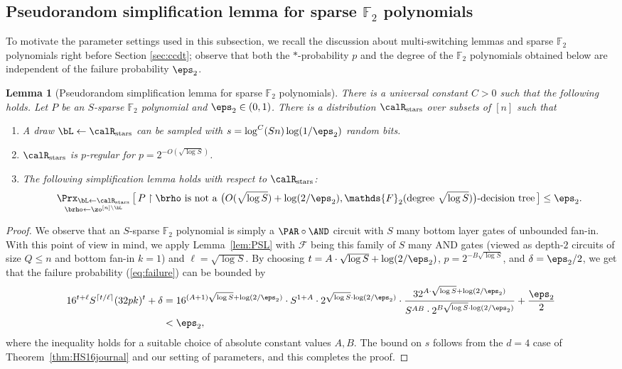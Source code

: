 \documentclass[11pt]{article}
\numberwithin{equation}{section}
\newtheorem{lemma}[theorem]{Lemma}
\theoremstyle{definition}
\theoremstyle{plain}
\theoremstyle{plain}
\newcommand{\uhr}{\upharpoonright}
\newcommand{\stars}{\mathrm{stars}}
\renewcommand{\F}{\mathds{F}}
\begin{document}
\subsection{Pseudorandom simplification lemma for sparse $\F_2$ polynomials} 

To motivate the parameter settings used in this subsection, we recall the discussion about multi-switching lemmas and sparse $\F_2$ polynomials right before Section \ref{sec:ccdt}; observe that both the $\ast$-probability $p$ and the degree of the $\F_2$ polynomials obtained below are independent of the failure probability $\eps_2$.
\begin{lemma}[Pseudorandom simplification lemma for sparse $\F_2$ polynomials] 
\label{lem:PSL-F2} 
There is a universal constant $C > 0$ such that the following holds. Let $P$ be an $S$-sparse $\F_2$ polynomial and $\eps_2 \in (0,1)$. There is a distribution $\calR_\stars$ over subsets of $[n]$ such that 
\begin{enumerate}
\item A draw $\bL \leftarrow \calR_\stars$ can be sampled with $s = \log^C(Sn) \log (1/\eps_2)$ random bits. 
\item $\calR_\stars$ is $p$-regular for $p = 2^{-O(\sqrt{\log S})}$. 
\item The following simplification lemma holds with respect to $\calR_\stars$: 
\[ \mathop{\Prx_{\bL\leftarrow\calR_\stars}}_{\brho\leftarrow\zo^{[n]\setminus \bL}}\big[\,\text{$P \uhr \brho$ is not a $\big(O(\sqrt{\log S}) + \log(2/\eps_2), \F_2(\text{degree $\sqrt{\log S}$})\big)$-decision tree}\,\big] \le \eps_2. \] 

\end{enumerate}
\end{lemma}


\begin{proof}
We observe that an $S$-sparse $\F_2$ polynomial is simply a $\PAR \circ \AND$ circuit with $S$ many bottom layer gates of unbounded fan-in.  With this point of view in mind, we apply Lemma~\ref{lem:PSL} with $\mathscr{F}$ being this family of $S$ many AND gates (viewed as depth-$2$ circuits of size $Q \le n$ and bottom fan-in $k=1$) and $\ell = \sqrt{\log S}$.  By choosing $t = A \cdot \sqrt{\log S} +  \log(2/\eps_2)$, $p = 2^{-B\sqrt{\log S}}$, and $\delta = \eps_2/2$, we get that the failure probability (\ref{eq:failure}) can be bounded by  
\begin{align*}  16^{t+\ell}S^{\lceil t/\ell\rceil} (32pk)^t + \delta &=
16^{(A+1)\sqrt{\log S} + \log(2/\eps_2)} \cdot S^{1+A} \cdot 2^{\sqrt{\log S} \cdot \log(2/\eps_2) } \cdot {\frac {32^{A \cdot \sqrt{\log S} + \log(2/\eps_2)}} {S^{AB} \cdot 2^{B \sqrt{\log S} \cdot \log(2/\eps_2)}}} + \frac{\eps_2}{2}\\
& < \eps_2,
\end{align*}
%
where the inequality holds for a suitable choice of absolute constant values $A,B$.  The bound on $s$ follows from the $d=4$ case of Theorem~\ref{thm:HS16journal} and our setting of parameters,
and this completes the proof. 
\end{proof} 
\end{document}
